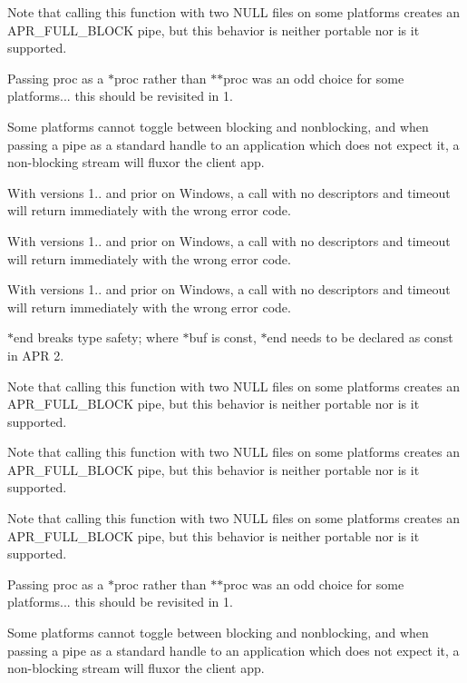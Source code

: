 \begin{DoxyRefList}
Note that calling this function with two N\+U\+LL files on some platforms creates an A\+P\+R\+\_\+\+F\+U\+L\+L\+\_\+\+B\+L\+O\+CK pipe, but this behavior is neither portable nor is it supported.

Passing proc as a $\ast$proc rather than $\ast$$\ast$proc was an odd choice for some platforms... this should be revisited in 1.  
\item[\label{bug__bug000002}%
\Hypertarget{bug__bug000002}%
Member \mbox{\hyperlink{group__apr__time_ga57bfe39a9516843a151a65cd02f84616}{A\+P\+R\+\_\+\+D\+E\+C\+L\+A\+RE}} (apr\+\_\+status\+\_\+t) apr\+\_\+time\+\_\+ansi\+\_\+put(apr\+\_\+time\+\_\+t $\ast$result]Some platforms cannot toggle between blocking and nonblocking, and when passing a pipe as a standard handle to an application which does not expect it, a non-\/blocking stream will fluxor the client app. 

With versions 1.. and prior on Windows, a call with no descriptors and timeout will return immediately with the wrong error code. 

With versions 1.. and prior on Windows, a call with no descriptors and timeout will return immediately with the wrong error code. 

With versions 1.. and prior on Windows, a call with no descriptors and timeout will return immediately with the wrong error code. 

$\ast$end breaks type safety; where $\ast$buf is const, $\ast$end needs to be declared as const in A\+PR 2. 

Note that calling this function with two N\+U\+LL files on some platforms creates an A\+P\+R\+\_\+\+F\+U\+L\+L\+\_\+\+B\+L\+O\+CK pipe, but this behavior is neither portable nor is it supported.

Note that calling this function with two N\+U\+LL files on some platforms creates an A\+P\+R\+\_\+\+F\+U\+L\+L\+\_\+\+B\+L\+O\+CK pipe, but this behavior is neither portable nor is it supported.

Note that calling this function with two N\+U\+LL files on some platforms creates an A\+P\+R\+\_\+\+F\+U\+L\+L\+\_\+\+B\+L\+O\+CK pipe, but this behavior is neither portable nor is it supported.

Passing proc as a $\ast$proc rather than $\ast$$\ast$proc was an odd choice for some platforms... this should be revisited in 1.  
\item[\label{bug__bug000002}%
\Hypertarget{bug__bug000002}%
Member \mbox{\hyperlink{group__apr__time_ga57bfe39a9516843a151a65cd02f84616}{A\+P\+R\+\_\+\+D\+E\+C\+L\+A\+RE}} (apr\+\_\+status\+\_\+t) apr\+\_\+time\+\_\+ansi\+\_\+put(apr\+\_\+time\+\_\+t $\ast$result]Some platforms cannot toggle between blocking and nonblocking, and when passing a pipe as a standard handle to an application which does not expect it, a non-\/blocking stream will fluxor the client app. 


\end{DoxyRefList}
